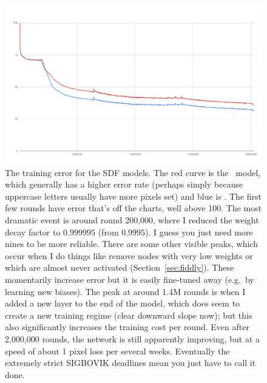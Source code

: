 \documentclass[twocolumn]{article}
\begin{document}
\begin{figure}[ht]
\centering
  \includegraphics[width=0.99 \linewidth]{sdfmergederror}
\caption{ The training error for the SDF models. The red curve is the
  \makeuppercase\ model, which generally has a higher error rate
  (perhaps simply because uppercase letters usually have more pixels
  set) and blue is \makelowercase. The first few rounds have error
  that's off the charts, well above 100. The most dramatic event is
  around round 200,000, where I reduced the weight decay factor to
  $0.999995$ (from $0.9995$). I guess you just need more nines to be
  more reliable. There are some other visible peaks, which occur when
  I do things like remove nodes with very low weights or which are
  almost never activated (Section~\ref{sec:fiddly}). These momentarily
  increase error but it is easily fine-tuned away (e.g.~by learning
  new biases). The peak at around 1.4M rounds is when I added a new
  layer to the end of the model, which does seem to create a new
  training regime (clear downward slope now); but this also
  significantly increases the training cost per round. Even after
  2,000,000 rounds, the network is still apparently improving, but at
  a speed of about 1 pixel loss per several weeks. Eventually the
  extremely strict SIGBOVIK deadlines mean you just have to call it done.
} \label{fig:sdfmergederror}
\end{figure}
\end{document}
